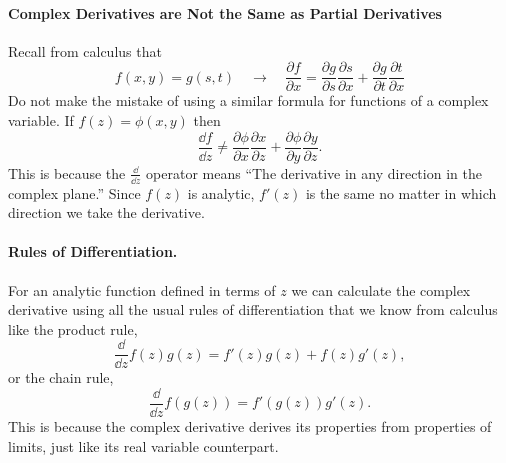 \paragraph{Complex Derivatives are Not the Same as Partial Derivatives}
Recall from calculus that
\[
f(x,y) = g(s,t) \quad \to \quad \frac{\partial f}{\partial x} =
\frac{\partial g}{\partial s}  \frac{\partial s}{\partial x} + \frac{\partial g}{\partial t}  \frac{\partial t}{\partial x}
\]
Do not make the mistake of using a similar formula for functions of
a complex variable.
If $f(z) = \phi(x,y)$ then
\[
\frac{\dd f}{\dd z} \neq \frac{\partial \phi}{\partial x} \frac{\partial x}{\partial z} + \frac{\partial \phi}{\partial y} 
\frac{\partial y}{\partial z}.
\]
This is because the $\frac{\dd}{\dd z}$ operator means ``The derivative in any
direction in the complex plane.''  Since $f(z)$ is analytic, $f'(z)$ is the
same no matter in which direction we take the derivative.  









\paragraph{Rules of Differentiation.}
For an analytic function defined in terms of $z$ we can calculate the complex
derivative using all the usual rules of differentiation that we know
from calculus like the product rule, 
\[
\frac{\dd}{\dd z} f(z) g(z) = f'(z) g(z) + f(z) g'(z),
\]
or the chain rule,
\[
\frac{\dd}{\dd z} f(g(z)) = f'(g(z)) g'(z).
\]
This is because the complex derivative derives its properties from properties
of limits, just like its real variable counterpart.










